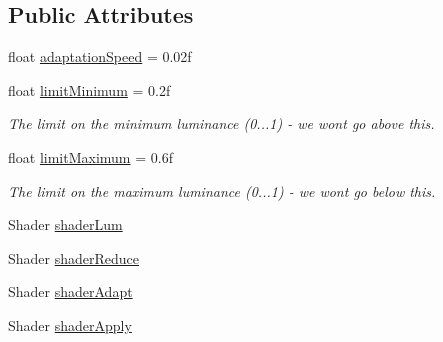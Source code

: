 \subsection*{Public Attributes}
\begin{DoxyCompactItemize}
\item 
float \mbox{\hyperlink{class_unity_standard_assets_1_1_image_effects_1_1_contrast_stretch_ab81f2962fed7bf78dc6d065d815fc195}{adaptation\+Speed}} = 0.\+02f
\item 
float \mbox{\hyperlink{class_unity_standard_assets_1_1_image_effects_1_1_contrast_stretch_af7b86c130f65b4b1f36fff63266a9cf6}{limit\+Minimum}} = 0.\+2f
\begin{DoxyCompactList}\small\item\em The limit on the minimum luminance (0...1) -\/ we won\textquotesingle{}t go above this. \end{DoxyCompactList}\item 
float \mbox{\hyperlink{class_unity_standard_assets_1_1_image_effects_1_1_contrast_stretch_a75173bbdb49e664a2d4bc33dfb67be15}{limit\+Maximum}} = 0.\+6f
\begin{DoxyCompactList}\small\item\em The limit on the maximum luminance (0...1) -\/ we won\textquotesingle{}t go below this. \end{DoxyCompactList}\item 
Shader \mbox{\hyperlink{class_unity_standard_assets_1_1_image_effects_1_1_contrast_stretch_a43da5e935fbd2503567535bb4d626e40}{shader\+Lum}}
\item 
Shader \mbox{\hyperlink{class_unity_standard_assets_1_1_image_effects_1_1_contrast_stretch_a713e2421a92d13f99892df3edac98acd}{shader\+Reduce}}
\item 
Shader \mbox{\hyperlink{class_unity_standard_assets_1_1_image_effects_1_1_contrast_stretch_ac01688755bbb7059ba53739dd823d3f7}{shader\+Adapt}}
\item 
Shader \mbox{\hyperlink{class_unity_standard_assets_1_1_image_effects_1_1_contrast_stretch_acd9e4e3bae17bf9471c9cc8350c5e162}{shader\+Apply}}
\end{DoxyCompactItemize}
